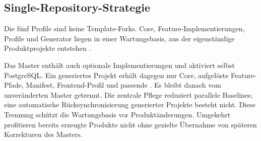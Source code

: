 \subsection{Single-Repository-Strategie}
\label{subsec:single-repository-strategie}

Die fünf Profile sind keine Template-Forks. Core, Feature-Implementierungen,
Profile und Generator liegen in einer Wartungsbasis, aus der eigenständige
Produktprojekte entstehen
\parencite{kleiveist2026profiles,kleiveist2026template}.

Das Master enthält auch optionale Implementierungen und aktiviert selbst
PostgreSQL. Ein generiertes Projekt erhält dagegen nur Core, aufgelöste
Feature-Pfade, Manifest, Frontend-Profil und passende . Es
bleibt danach vom unveränderten Master getrennt. Die zentrale Pflege reduziert
parallele Baselines; eine automatische Rücksynchronisierung generierter
Projekte besteht nicht.
Diese Trennung schützt die Wartungsbasis vor Produktänderungen. Umgekehrt
profitieren bereits erzeugte Produkte nicht ohne gezielte Übernahme von
späteren Korrekturen des Masters.
